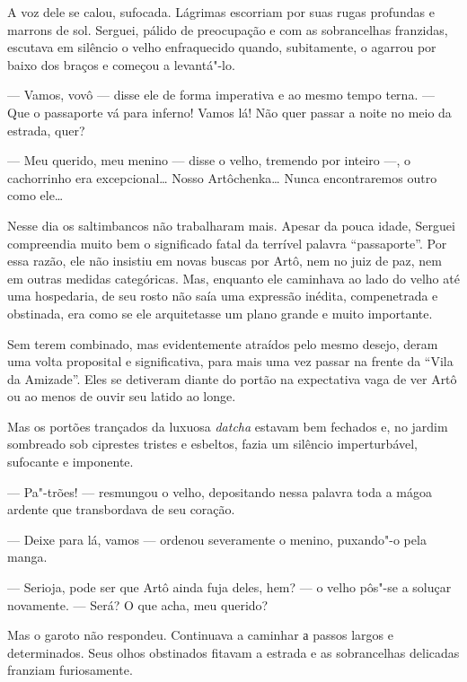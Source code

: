 A voz dele se calou, sufocada. Lágrimas escorriam por suas rugas
profundas e marrons de sol. Serguei, pálido de preocupação e com as
sobrancelhas franzidas, escutava em silêncio o velho enfraquecido
quando, subitamente, o agarrou por baixo dos braços e começou a
levantá"-lo.

--- Vamos, vovô --- disse ele de forma imperativa e ao mesmo tempo
terna. --- Que o passaporte vá para inferno! Vamos lá! Não quer passar a
noite no meio da estrada, quer?

--- Meu querido, meu menino --- disse o velho, tremendo por inteiro ---,
o cachorrinho era excepcional\ldots{} Nosso Artôchenka\ldots{} Nunca encontraremos
outro como ele\ldots{}


Nesse dia os saltimbancos não trabalharam mais. Apesar da pouca idade,
Serguei compreendia muito bem o significado fatal da terrível palavra
``passaporte''. Por essa razão, ele não insistiu em novas buscas por
Artô, nem no juiz de paz, nem em outras medidas categóricas. Mas,
enquanto ele caminhava ao lado do velho até uma hospedaria, de seu rosto
não saía uma expressão inédita, compenetrada e obstinada, era como se
ele arquitetasse um plano grande e muito importante.

Sem terem combinado, mas evidentemente atraídos pelo mesmo desejo, deram
uma volta proposital e significativa, para mais uma vez passar na frente
da ``Vila da Amizade''. Eles se detiveram diante do portão na
expectativa vaga de ver Artô ou ao menos de ouvir seu latido ao longe.

Mas os portões trançados da luxuosa \emph{datcha} estavam bem fechados
e, no jardim sombreado sob ciprestes tristes e esbeltos, fazia um
silêncio imperturbável, sufocante e imponente.

--- Pa"-trões! --- resmungou o velho, depositando nessa palavra toda a
mágoa ardente que transbordava de seu coração.

--- Deixe para lá, vamos --- ordenou severamente o menino, puxando"-o
pela manga.

--- Serioja, pode ser que Artô ainda fuja deles, hem? --- o velho pôs"-se
a soluçar novamente. --- Será? O que acha, meu querido?

Mas o garoto não respondeu. Continuava a caminhar а passos largos e
determinados. Seus olhos obstinados fitavam a estrada e as sobrancelhas
delicadas franziam furiosamente.

